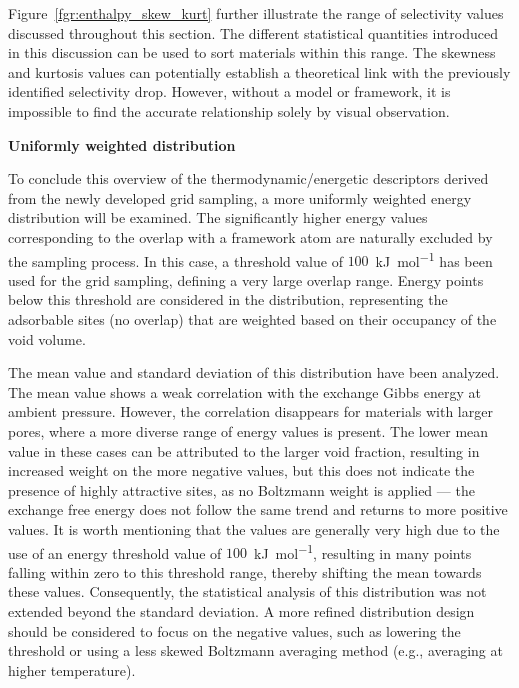 \documentclass[main]{subfiles}
\begin{document}
Figure~\ref{fgr:enthalpy_skew_kurt} further illustrate the range of selectivity values discussed throughout this section. The different statistical quantities introduced in this discussion can be used to sort materials within this range. The skewness and kurtosis values can potentially establish a theoretical link with the previously identified selectivity drop. However, without a model or framework, it is impossible to find the accurate relationship solely by visual observation.

\textbf{Uniformly weighted distribution}

To conclude this overview of the thermodynamic/energetic descriptors derived from the newly developed grid sampling, a more uniformly weighted energy distribution will be examined. The significantly higher energy values corresponding to the overlap with a framework atom are naturally excluded by the sampling process. In this case, a threshold value of $100$~\si{\kilo\joule\per\mole} has been used for the grid sampling, defining a very large overlap range. Energy points below this threshold are considered in the distribution, representing the adsorbable sites (no overlap) that are weighted based on their occupancy of the void volume.

The mean value and standard deviation of this distribution have been analyzed. The mean value shows a weak correlation with the exchange Gibbs energy at ambient pressure. However, the correlation disappears for materials with larger pores, where a more diverse range of energy values is present. The lower mean value in these cases can be attributed to the larger void fraction, resulting in increased weight on the more negative values, but this does not indicate the presence of highly attractive sites, as no Boltzmann weight is applied  --- the exchange free energy does not follow the same trend and returns to more positive values. It is worth mentioning that the values are generally very high due to the use of an energy threshold value of $100$~\si{\kilo\joule\per\mole}, resulting in many points falling within zero to this threshold range, thereby shifting the mean towards these values. Consequently, the statistical analysis of this distribution was not extended beyond the standard deviation. A more refined distribution design should be considered to focus on the negative values, such as lowering the threshold or using a less skewed Boltzmann averaging method (e.g., averaging at higher temperature).
\end{document}
